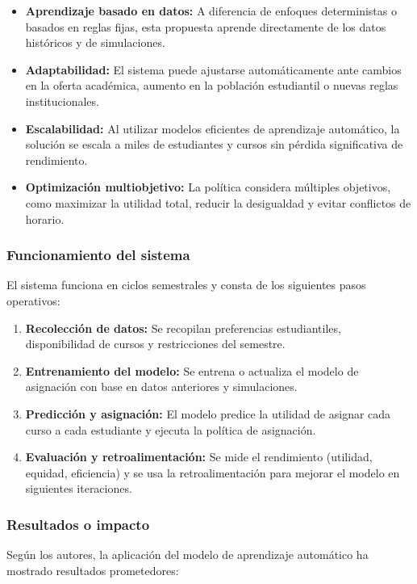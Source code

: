 \documentclass{article}
\begin{document}
\begin{itemize}
  \item \textbf{Aprendizaje basado en datos:} A diferencia de enfoques deterministas o basados en reglas fijas, esta propuesta aprende directamente de los datos históricos y de simulaciones.
  \item \textbf{Adaptabilidad:} El sistema puede ajustarse automáticamente ante cambios en la oferta académica, aumento en la población estudiantil o nuevas reglas institucionales.
  \item \textbf{Escalabilidad:} Al utilizar modelos eficientes de aprendizaje automático, la solución se escala a miles de estudiantes y cursos sin pérdida significativa de rendimiento.
  \item \textbf{Optimización multiobjetivo:} La política considera múltiples objetivos, como maximizar la utilidad total, reducir la desigualdad y evitar conflictos de horario.
\end{itemize}

\subsubsection{Funcionamiento del sistema}

El sistema funciona en ciclos semestrales y consta de los siguientes pasos operativos:

\begin{enumerate}
  \item \textbf{Recolección de datos:} Se recopilan preferencias estudiantiles, disponibilidad de cursos y restricciones del semestre.
  \item \textbf{Entrenamiento del modelo:} Se entrena o actualiza el modelo de asignación con base en datos anteriores y simulaciones.
  \item \textbf{Predicción y asignación:} El modelo predice la utilidad de asignar cada curso a cada estudiante y ejecuta la política de asignación.
  \item \textbf{Evaluación y retroalimentación:} Se mide el rendimiento (utilidad, equidad, eficiencia) y se usa la retroalimentación para mejorar el modelo en siguientes iteraciones.
\end{enumerate}

\subsubsection{Resultados o impacto}

Según los autores, la aplicación del modelo de aprendizaje automático ha mostrado resultados prometedores:
\end{document}
